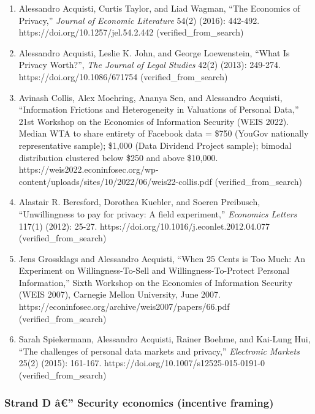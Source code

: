 \documentclass[
  11pt,
]{article}
\providecommand{\tightlist}{%
  \setlength{\itemsep}{0pt}\setlength{\parskip}{0pt}}
\begin{document}
\begin{enumerate}
\def\labelenumi{\arabic{enumi}.}
\setcounter{enumi}{8}
\tightlist
\item
  Alessandro Acquisti, Curtis Taylor, and Liad Wagman, ``The Economics
  of Privacy,'' \emph{Journal of Economic Literature} 54(2) (2016):
  442-492. https://doi.org/10.1257/jel.54.2.442 (verified\_from\_search)
\item
  Alessandro Acquisti, Leslie K. John, and George Loewenstein, ``What Is
  Privacy Worth?'', \emph{The Journal of Legal Studies} 42(2) (2013):
  249-274. https://doi.org/10.1086/671754 (verified\_from\_search)
\item
  Avinash Collis, Alex Moehring, Ananya Sen, and Alessandro Acquisti,
  ``Information Frictions and Heterogeneity in Valuations of Personal
  Data,'' 21st Workshop on the Economics of Information Security (WEIS
  2022). Median WTA to share entirety of Facebook data = \$750 (YouGov
  nationally representative sample); \$1,000 (Data Dividend Project
  sample); bimodal distribution clustered below \$250 and above
  \$10,000.
  https://weis2022.econinfosec.org/wp-content/uploads/sites/10/2022/06/weis22-collis.pdf
  (verified\_from\_search)
\item
  Alastair R. Beresford, Dorothea Kuebler, and Soeren Preibusch,
  ``Unwillingness to pay for privacy: A field experiment,''
  \emph{Economics Letters} 117(1) (2012): 25-27.
  https://doi.org/10.1016/j.econlet.2012.04.077 (verified\_from\_search)
\item
  Jens Grossklags and Alessandro Acquisti, ``When 25 Cents is Too Much:
  An Experiment on Willingness-To-Sell and Willingness-To-Protect
  Personal Information,'' Sixth Workshop on the Economics of Information
  Security (WEIS 2007), Carnegie Mellon University, June 2007.
  https://econinfosec.org/archive/weis2007/papers/66.pdf
  (verified\_from\_search)
\item
  Sarah Spiekermann, Alessandro Acquisti, Rainer Boehme, and Kai-Lung
  Hui, ``The challenges of personal data markets and privacy,''
  \emph{Electronic Markets} 25(2) (2015): 161-167.
  https://doi.org/10.1007/s12525-015-0191-0 (verified\_from\_search)
\end{enumerate}

\subsubsection{Strand D â€'' Security economics (incentive
framing)}\label{strand-d-uxe2-security-economics-incentive-framing}
\end{document}
